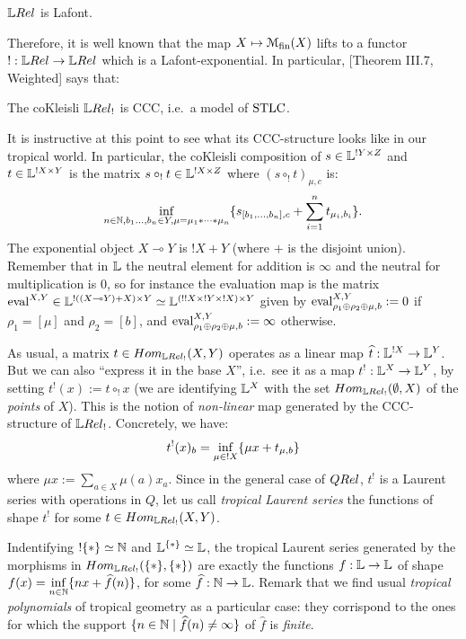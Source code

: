 \begin{fact}
 $\LREL$ is Lafont.
\end{fact}

Therefore, it is well known that the map $X\mapsto \mathcal{M}_{\mathrm{fin}}(X)$ lifts to a functor $!:\LREL\to\LREL$ which %
is a Lafont-exponential.
In particular, [Theorem III.7, Weighted] says that:
\begin{fact}
 The coKleisli $\LREL_!$ is CCC, i.e.\ a model of $\mathrm{STLC}$.
\end{fact}

It is instructive at this point to see what its CCC-structure looks like in our tropical world.
In particular, the coKleisli composition of $s\in\mathbb{L}^{!Y\times Z}$ and $t\in\mathbb{L}^{!X\times Y}$ is the matrix $s\circ_! t\in\mathbb{L}^{!X\times Z}$ where $(s\circ_! t)_{\mu,c}$ is:
\[
 \inf\limits_{n\in\mathbb{N}, b_1\dots,b_n\in Y, \mu = \mu_1*\cdots *\mu_n}
 \{s_{[b_1,\dots,b_n],c} + \sum\limits_{i=1}^n t_{\mu_i,b_i}\}.
\]
The exponential object $X\multimap Y$ is $!X+Y$ (where $+$ is the disjoint union).
Remember that in $\mathbb{L}$ the neutral element for addition is $\infty$ and the neutral for multiplication is $0$, so for instance the evaluation map is the matrix $\mathrm{eval}^{X,Y}\in\mathbb{L}^{!((X\multimap Y) + X)\times Y}\simeq\mathbb{L}^{(!!X\times !Y\times !X)\times Y}$ given by $\mathrm{eval}^{X,Y}_{\rho_1\oplus\rho_2\oplus\mu,b}:=0$ if $\rho_1=[\mu]$ and $\rho_2=[b]$, and $\mathrm{eval}^{X,Y}_{\rho_1\oplus\rho_2\oplus\mu,b}:=\infty$ otherwise.

\begin{remark}
 As usual, a matrix $t\in\HOM{\LREL_!}{X}{Y}$ operates as a linear map $\widehat t:\mathbb{L}^{!X}\to\mathbb{L}^Y$.
 But we can also ``express it in the base $X$'', i.e.\ see it as a map $t^!:\mathbb{L}^X\to\mathbb{L}^Y$, by setting $t^!(x):=t\circ_! x$ (we are identifying $\mathbb{L}^X$ with the set $\HOM{\LREL_!}{\emptyset}{X}$ of the \emph{points} of $X$).
 This is the notion of \emph{non-linear} map generated by the CCC-structure of $\LREL_!$.
 Concretely, we have:
 \[t^!(x)_b=\inf\limits_{\mu\in !X} \{\mu x+ t_{\mu,b}\}\] where $\mu x:=\sum\limits_{a\in X} \mu(a)x_a$.
 Since in the general case of $\QREL$, $t^!$ is a Laurent series with operations in $Q$, let us call \emph{tropical Laurent series} the functions of shape $t^!$ for some $t\in\HOM{\LREL_!}{X}{Y}$.
\end{remark}

\begin{remark}
 Indentifying $!\{*\}\simeq \mathbb{N}$ and $\mathbb{L}^{\{*\}}\simeq\mathbb{L}$, the tropical Laurent series generated by the morphisms in $\HOM{\LREL_!}{\set{*}}{\set{*}}$ are exactly the functions $f:\mathbb{L}\to\mathbb{L}$ of shape $f(x)=\inf\limits_{n\in\mathbb{N}}\{nx+\widehat f(n)\}$, for some $\widehat f:\mathbb{N}\to\mathbb{L}$.
Remark that we find usual \emph{tropical polynomials} of tropical geometry as a particular case: they corrispond to the ones for which the support $\{n\in\mathbb{N}\mid\widehat f(n)\neq\infty\}$ of $\widehat f$ is \emph{finite}.
\end{remark}


